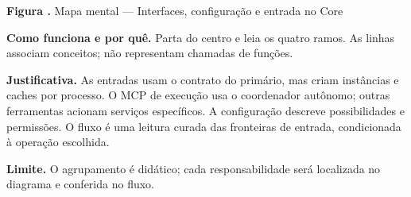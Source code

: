 {\small\textbf{Figura \thefigure.} Mapa mental --- Interfaces, configuração e entrada no Core}\par\smallskip
\noindent\textbf{Como funciona e por quê.} Parta do centro e leia os quatro ramos. As linhas associam conceitos; não representam chamadas de funções.\par
\noindent\textbf{Justificativa.} As entradas usam o contrato do primário, mas criam instâncias e caches por processo. O MCP de execução usa o coordenador autônomo; outras ferramentas acionam serviços específicos. A configuração descreve possibilidades e permissões. O fluxo é uma leitura curada das fronteiras de entrada, condicionada à operação escolhida.\par
\noindent\textbf{Limite.} O agrupamento é didático; cada responsabilidade será localizada no diagrama e conferida no fluxo.\par\smallskip
{}
